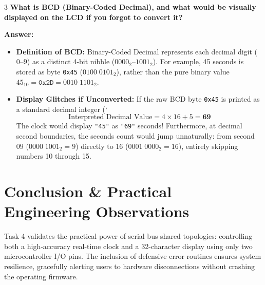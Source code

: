 \documentclass[11pt,a4paper]{article}
\begin{document}
\begin{questionbox}{3}
\textbf{What is BCD (Binary-Coded Decimal), and what would be visually displayed on the LCD if you forgot to convert it?}
\end{questionbox}
\textbf{Answer:}
\begin{itemize}
    \item \textbf{Definition of BCD:} Binary-Coded Decimal represents each decimal digit ($0\text{--}9$) as a distinct 4-bit nibble ($0000_2\text{--}1001_2$). For example, 45 seconds is stored as byte \texttt{0x45} ($0100\;0101_2$), rather than the pure binary value $45_{10} = \texttt{0x2D} = 0010\;1101_2$.
    \item \textbf{Display Glitches if Unconverted:} If the raw BCD byte \texttt{0x45} is printed as a standard decimal integer (`%
    \begin{equation}
    \text{Interpreted Decimal Value} = 4 \times 16 + 5 = \mathbf{69}
    \end{equation}
    The clock would display \texttt{"45"} as \texttt{"69"} seconds! Furthermore, at decimal second boundaries, the seconds count would jump unnaturally: from second $09$ ($0000\;1001_2 = 9$) directly to $16$ ($0001\;0000_2 = 16$), entirely skipping numbers 10 through 15.
\end{itemize}

\section{Conclusion \& Practical Engineering Observations}
Task 4 validates the practical power of serial bus shared topologies: controlling both a high-accuracy real-time clock and a 32-character display using only two microcontroller I/O pins. The inclusion of defensive error routines ensures system resilience, gracefully alerting users to hardware disconnections without crashing the operating firmware.
\end{document}

